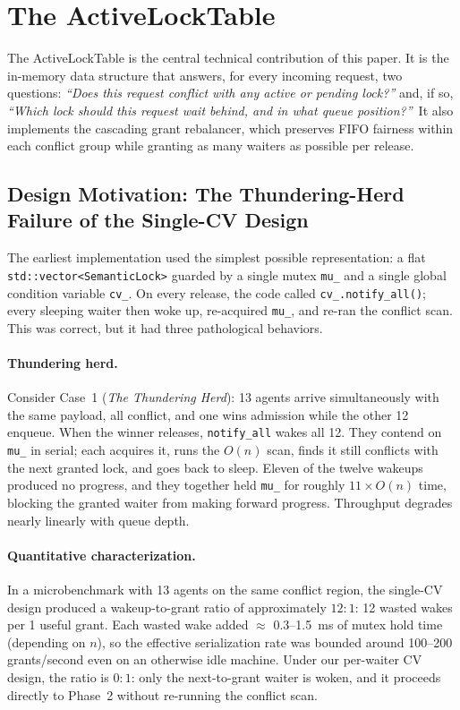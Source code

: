 \documentclass[sigconf]{acmart}
\begin{document}
\section{The ActiveLockTable}
\label{sec:lock-table}

The ActiveLockTable is the central technical contribution of this paper.
It is the in-memory data structure that answers, for every incoming
request, two questions: \emph{``Does this request conflict with any
active or pending lock?''} and, if so, \emph{``Which lock should this
request wait behind, and in what queue position?''}\ It also implements
the cascading grant rebalancer, which preserves FIFO fairness within each
conflict group while granting as many waiters as possible per release.

\subsection{Design Motivation: The Thundering-Herd Failure of the
Single-CV Design}
\label{sec:lock-motivation}

The earliest implementation used the simplest possible representation:
a flat \texttt{std::vector<SemanticLock>} guarded by a single mutex
\texttt{mu\_} and a single global condition variable \texttt{cv\_}.
On every release, the code called \texttt{cv\_.notify\_all()}; every
sleeping waiter then woke up, re-acquired \texttt{mu\_}, and re-ran the
conflict scan. This was correct, but it had three pathological behaviors.

\paragraph{\textbf{Thundering herd.}}
Consider Case~1 (\emph{The Thundering Herd}): 13 agents arrive
simultaneously with the same payload, all conflict, and one wins
admission while the other 12 enqueue. When the winner releases,
\texttt{notify\_all} wakes all 12. They contend on \texttt{mu\_} in
serial; each acquires it, runs the $O(n)$ scan, finds it still conflicts
with the next granted lock, and goes back to sleep. Eleven of the twelve
wakeups produced no progress, and they together held \texttt{mu\_} for
roughly $11\times O(n)$ time, blocking the granted waiter from making
forward progress. Throughput degrades nearly linearly with queue depth.

\paragraph{\textbf{Quantitative characterization.}}
In a microbenchmark with 13 agents on the same conflict region, the
single-CV design produced a wakeup-to-grant ratio of approximately
$12{:}1$: 12 wasted wakes per 1 useful grant. Each wasted wake added
$\approx$ 0.3--1.5~ms of mutex hold time (depending on $n$), so the
effective serialization rate was bounded around 100--200 grants/second
even on an otherwise idle machine. Under our per-waiter CV design, the
ratio is $0{:}1$: only the next-to-grant waiter is woken, and it
proceeds directly to Phase~2 without re-running the conflict scan.
\end{document}
